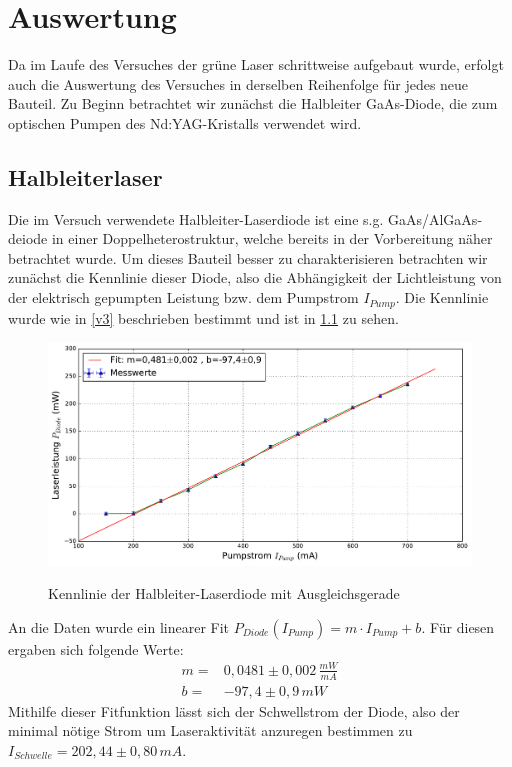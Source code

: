 \documentclass[twoside,colorback,accentcolor=tud4c,11pt]{tudreport}
\begin{document}
     	
\chapter{Auswertung}
Da im Laufe des Versuches der grüne Laser schrittweise aufgebaut wurde, erfolgt auch die  Auswertung des Versuches in derselben Reihenfolge für jedes neue Bauteil. Zu Beginn betrachtet wir zunächst die Halbleiter GaAs-Diode, die zum optischen Pumpen des Nd:YAG-Kristalls verwendet wird.
\section{Halbleiterlaser}
Die im Versuch verwendete Halbleiter-Laserdiode ist eine s.g. GaAs/AlGaAs-deiode in einer Doppelheterostruktur, welche bereits in der Vorbereitung näher betrachtet wurde. Um dieses Bauteil besser zu charakterisieren betrachten wir zunächst die Kennlinie dieser Diode, also die Abhängigkeit der Lichtleistung von der elektrisch gepumpten Leistung bzw. dem Pumpstrom $I_{Pump}$. Die Kennlinie wurde wie in \ref{v3} beschrieben bestimmt und ist in \ref{kd} zu sehen.
\begin{figure}[H]
\centering
   	\begin{minipage}[b]{0.9\textwidth}
   	\includegraphics[width=\textwidth]{graphics/kennlinie_diode.pdf}
  	\label{kd}
   	\end{minipage}
\caption{Kennlinie der Halbleiter-Laserdiode mit Ausgleichsgerade}	
\end{figure}
An die Daten wurde ein linearer Fit $P_{Diode}(I_{Pump})=m\cdot I_{Pump} +b $. Für diesen ergaben sich folgende Werte:
\begin{align}
m=& 0,0481 \pm 0,002\,\si{\frac{mW}{mA}}\\
b=& -97,4 \pm 0,9\,\si{mW}
\end{align}
Mithilfe dieser Fitfunktion lässt sich der Schwellstrom der Diode, also der minimal nötige Strom um Laseraktivität anzuregen bestimmen zu $I_{Schwelle}=202,44\pm 0,80\,\si{mA}$.\\
\end{document}
